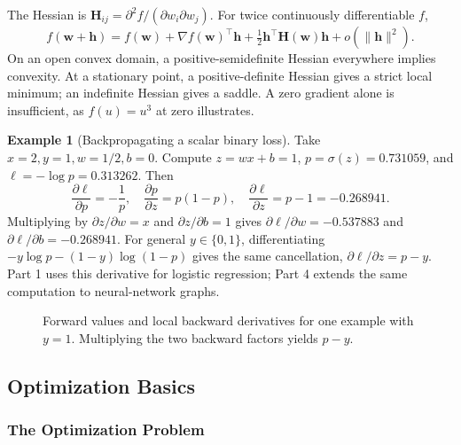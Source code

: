 \documentclass[11pt,twoside]{article}
\numberwithin{equation}{section}
\newcommand{\vect}[1]{\bm{#1}}
\newcommand{\mat}[1]{\bm{#1}}
\theoremstyle{plain}
\theoremstyle{definition}
\newtheorem{example}[theorem]{Example}
\theoremstyle{remark}
\begin{document}
The Hessian is $\mat H_{ij}=\partial^2 f/(\partial w_i\partial w_j)$. For twice continuously differentiable $f$,
\[
f(\vect w+\vect h)=f(\vect w)+\nabla f(\vect w)^\top\vect h
+\tfrac12\vect h^\top\mat H(\vect w)\vect h+o(\|\vect h\|^2).
\]
On an open convex domain, a positive-semidefinite Hessian everywhere implies convexity. At a stationary point, a positive-definite Hessian gives a strict local minimum; an indefinite Hessian gives a saddle. A zero gradient alone is insufficient, as $f(u)=u^3$ at zero illustrates.

\begin{example}[Backpropagating a scalar binary loss]
Take $x=2,y=1,w=1/2,b=0$. Compute $z=wx+b=1$, $p=\sigma(z)=0.731059$, and $\ell=-\log p=0.313262$. Then
\[
\frac{\partial\ell}{\partial p}=-\frac1p,\quad
\frac{\partial p}{\partial z}=p(1-p),\quad
\frac{\partial\ell}{\partial z}=p-1=-0.268941.
\]
Multiplying by $\partial z/\partial w=x$ and $\partial z/\partial b=1$ gives $\partial\ell/\partial w=-0.537883$ and $\partial\ell/\partial b=-0.268941$. For general $y\in\{0,1\}$, differentiating $-y\log p-(1-y)\log(1-p)$ gives the same cancellation, $\partial\ell/\partial z=p-y$. Part 1 uses this derivative for logistic regression; Part 4 extends the same computation to neural-network graphs.
\end{example}

\begin{figure}[H]
\centering
{}
\caption{Forward values and local backward derivatives for one example with $y=1$. Multiplying the two backward factors yields $p-y$.}
\end{figure}

\subsection{Optimization Basics}

\subsubsection{The Optimization Problem}
\end{document}
